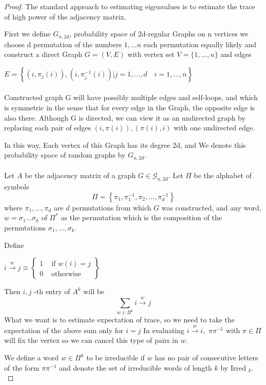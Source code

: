 \documentclass[oneside]{book}
\begin{document}
\begin{proof}
 The standard approach to estimating eigenvalues is to estimate the trace of high power of the adjacency matrix.\par
First we define ${G}_{n, 2d}$, probability space of 2d-regular Graphs on n vertices    we choose d permutation of the numbers ${1,\ldots n}$ each permutation equally likely and construct a direct Graph $G = (V,E) $ with  vertex set $V=\{1, \ldots, n\}$ and edges\par
$E=\left\{\left(i, \pi_{j}(i)\right),\left(i, \pi_{j}^{-1}(i)\right) | j=1, \ldots, d \quad i=1, \ldots, n\right\}$ \\\\
Constructed graph G will have possibly multiple edges and self-loops, and which is symmetric in the sense that for every edge in the Graph, the opposite edge is also there. Although G is directed, we can view it as an undirected graph by
replacing each pair of edges $(i, \pi(i)), (\pi(i), i) $ with one undirected edge.\par In this way, Each vertex of this Graph has its degree 2d, and  We denote
this probability space of random graphs by $G_{n,2d}$. \\\\
Let $A$ be the adjacency matrix of a graph $G \in \mathscr{G}_{n, 2 d}$. Let $\Pi$ be the alphabet of symbols
$$
\Pi=\left\{\pi_{1}, \pi_{1}^{-1}, \pi_{2}, \ldots, \pi_{d}^{-1}\right\}
$$
where  $\pi_{1}, \ldots, \pi_{d}$ are  $d$ permutations from which $G$ was constructed, and any word, $w=\sigma_{1} \ldots \sigma_{k}$ of $\Pi^{*}$ as the permutation which is the composition of the permutations $\sigma_{1}, \ldots, \sigma_{k} .$ \par
Define  \begin{center}
   $i \stackrel{w}{\rightarrow} j \equiv\left\{\begin{array}{ll}
1 & \text { if  }  w(i)=j \\
0 & \text { otherwise }
\end{array}\right\}$ 
\end{center}
Then  $i, j$ -th entry of $A^{k}$ will be 
$$
\sum_{w \in \Pi^{k}} i \stackrel{w}{\rightarrow} j
$$
What we want is  to estimate expectation of  trace, so we need to take the expectation of the above sum only for  $i = j$      
 In evaluating $i \stackrel{w}{\rightarrow} i,$  $\pi \pi^{-1}$ with $\pi \in \Pi $    will fix the vertex so we can cancel this type of pairs in  $w$.\par
 We define a word $w \in \Pi^{k}$ to be irreducible if $w$ has no pair of consecutive letters of the form $\pi \pi^{-1}$ and denote the set of irreducible words of length $k$ by Irred $_{k} .$\par

\end{proof}
\end{document}
